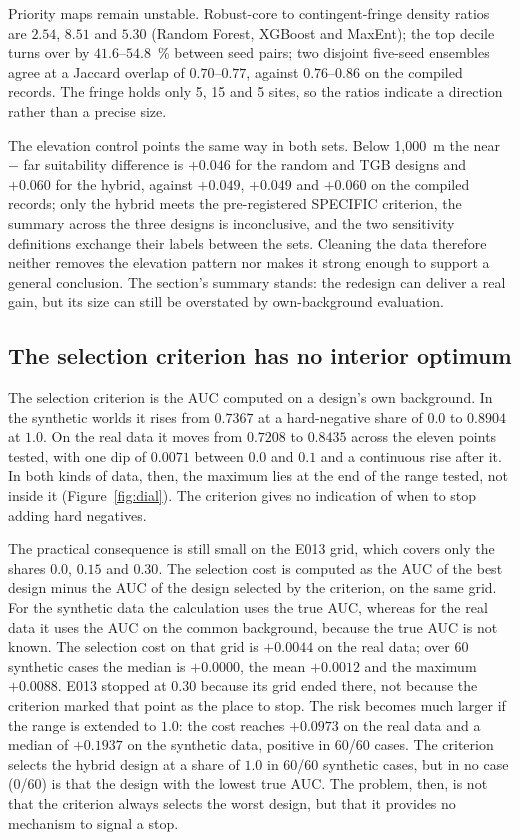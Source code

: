 \documentclass[12pt]{article}
\begin{document}
Priority maps remain unstable.
Robust-core to contingent-fringe density ratios are $2.54$, $8.51$ and $5.30$ (Random Forest, XGBoost and MaxEnt); the top decile turns over by $41.6$--$54.8$~\% between seed pairs; two disjoint five-seed ensembles agree at a Jaccard overlap of $0.70$--$0.77$, against $0.76$--$0.86$ on the compiled records.
The fringe holds only 5, 15 and 5 sites, so the ratios indicate a direction rather than a precise size.

The elevation control points the same way in both sets.
Below 1,000~m the near $-$ far suitability difference is $+0.046$ for the random and TGB designs and $+0.060$ for the hybrid, against $+0.049$, $+0.049$ and $+0.060$ on the compiled records; only the hybrid meets the pre-registered SPECIFIC criterion, the summary across the three designs is inconclusive, and the two sensitivity definitions exchange their labels between the sets.
Cleaning the data therefore neither removes the elevation pattern nor makes it strong enough to support a general conclusion.
The section's summary stands: the redesign can deliver a real gain, but its size can still be overstated by own-background evaluation.

\subsection{The selection criterion has no interior optimum}
\label{sec:nooptimum}

The selection criterion is the AUC computed on a design's own background.
In the synthetic worlds it rises from $0.7367$ at a hard-negative share of $0.0$ to $0.8904$ at $1.0$.
On the real data it moves from $0.7208$ to $0.8435$ across the eleven points tested, with one dip of $0.0071$ between $0.0$ and $0.1$ and a continuous rise after it.
In both kinds of data, then, the maximum lies at the end of the range tested, not inside it (Figure~\ref{fig:dial}).
The criterion gives no indication of when to stop adding hard negatives.

The practical consequence is still small on the E013 grid, which covers only the shares $0.0$, $0.15$ and $0.30$.
The selection cost is computed as the AUC of the best design minus the AUC of the design selected by the criterion, on the same grid.
For the synthetic data the calculation uses the true AUC, whereas for the real data it uses the AUC on the common background, because the true AUC is not known.
The selection cost on that grid is $+0.0044$ on the real data; over 60 synthetic cases the median is $+0.0000$, the mean $+0.0012$ and the maximum $+0.0088$.
E013 stopped at $0.30$ because its grid ended there, not because the criterion marked that point as the place to stop.
The risk becomes much larger if the range is extended to $1.0$: the cost reaches $+0.0973$ on the real data and a median of $+0.1937$ on the synthetic data, positive in 60/60 cases.
The criterion selects the hybrid design at a share of $1.0$ in 60/60 synthetic cases, but in no case (0/60) is that the design with the lowest true AUC.
The problem, then, is not that the criterion always selects the worst design, but that it provides no mechanism to signal a stop.
\end{document}
